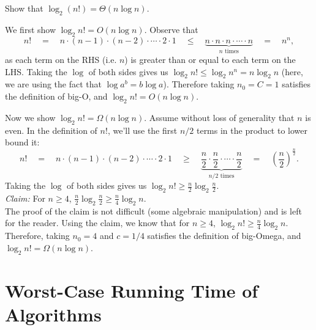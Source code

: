 \begin{flex}
\label{grp:exercise:Practice-with-Theta}

\begin{exercise}
\label{exercise:Practice-with-Theta}
Show that $\log_2 (n!) = \Theta(n \log n)$.

\end{exercise}

\begin{solution}
\label{sol:time-complexity::observe}
We first show $\log_2 n! = O(n \log n)$. Observe that
\[
n! \quad = \quad n \cdot (n-1) \cdot (n-2) \cdot \cdots \cdot 2 \cdot 1 \quad \leq \quad \underbrace{n \cdot n \cdot n \cdot \cdots \cdot n}_{n \text{ times}} \quad = \quad n^n,
\]
as each term on the RHS (i.e. $n$) is greater than or equal to each term on the LHS. Taking the $\log$ of both sides gives us $\log_2 n! \leq \log_2 n^n = n \log_2 n$ (here, we are using the fact that $\log a^b = b \log a$). Therefore taking $n_0 = C = 1$ satisfies the definition of big-O, and $\log_2 n! = O(n \log n)$.

Now we show $\log_2 n! = \Omega(n \log n)$. Assume without loss of generality that $n$ is even. In the definition of $n!$, we'll use the first $n/2$ terms in the product to lower bound it:
\[
n! \quad = \quad n \cdot (n-1) \cdot (n-2) \cdot \cdots \cdot 2 \cdot 1 \quad \geq \quad \underbrace{\frac{n}{2} \cdot \frac{n}{2} \cdot \cdots \cdot \frac{n}{2}}_{n/2 \text{ times} } \quad = \quad \left(\frac{n}{2}\right)^{\frac{n}{2}}.
\]
Taking the $\log$ of both sides gives us $\log_2 n! \geq \frac{n}{2} \log_2 \frac{n}{2}$.
\\

\noindent
\emph{Claim:} For $n \geq 4$, $\frac{n}{2} \log_2 \frac{n}{2} \geq \frac{n}{4} \log_2 n$.
\\

The proof of the claim is not difficult (some algebraic manipulation) and is left for the reader. Using the claim, we know that for $n \geq 4$, $\log_2 n! \geq  \frac{n}{4} \log_2 n$. Therefore, taking $n_0 = 4$ and $c = 1/4$ satisfies the definition of big-Omega, and $\log_2 n! = \Omega(n \log n)$.

\end{solution}
\end{flex}


\section{Worst-Case Running Time of Algorithms}
\label{sec:time-complexity::worst-case-running-time-of-algorithms}

